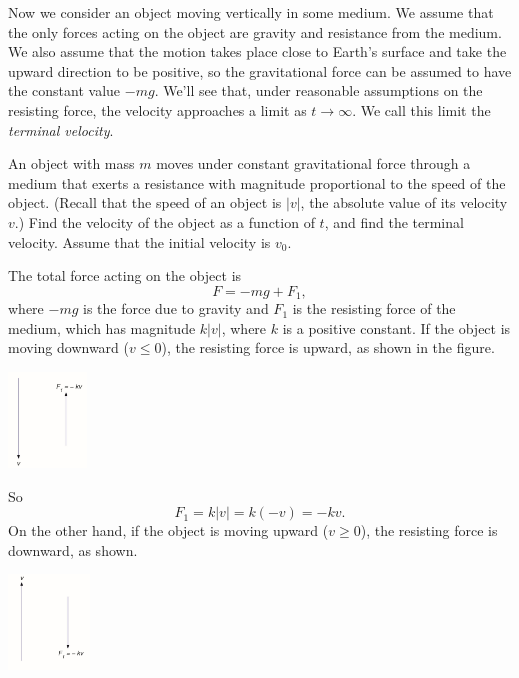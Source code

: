 \documentclass{ximera}
\begin{document}
Now we consider an object moving vertically in some medium. We assume
that the only forces acting on the object are gravity and resistance
from the medium. We also assume that the motion takes place close to
Earth's surface and take the upward direction to be positive, so
 the gravitational force can be assumed to have the constant value
 $-mg$. We'll see that, under reasonable assumptions on the
resisting force, the velocity approaches a limit as $t\to\infty$.
We call this limit the \textit{terminal velocity}.
 
\begin{example}\label{example:4.3.1}
An object with mass $m$ moves under constant gravitational force
through a medium that exerts a resistance with magnitude proportional
to the speed of the object. (Recall that the speed of an object is
$|v|$, the absolute value of its velocity $v$.) Find the velocity of
the object as a function of $t$, and find the terminal velocity.
Assume  that the initial velocity is $v_0$.
  
 
\begin{explanation}
The total force acting on the object is
\begin{equation} \label{eq:4.3.4}
F=-mg+F_1,
\end{equation}
where $-mg$ is  the force due to  gravity and $F_1$ is the
resisting force of the medium, which has magnitude $k|v|$, where $k$ is a
positive constant. If the
object is moving downward ($v\leq 0$),  the resisting force is
upward, as shown in the figure.
 
\begin{image}
  \includegraphics[height=1in]{fig040301a.jpg}
\end{image}
 
So
$$
F_1=k|v|=k(-v)=-kv.
$$
On the other hand, if the object is moving upward ($v\geq 0$),
the resisting force is downward, as shown.
 
\begin{image}
  \includegraphics[height=1in]{fig040301b.jpg}
\end{image}
 

\end{explanation}
\end{example}
\end{document}

